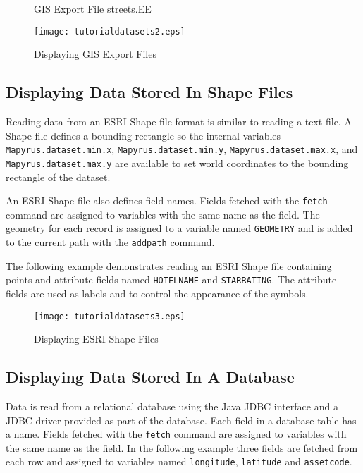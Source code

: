 \begin{figure}[htb]

\caption{GIS Export File streets.EE}
\label{streetsEE}
\end{figure}



\begin{figure}[htb]
\texttt{[image: tutorialdatasets2.eps]}
\caption{Displaying GIS Export Files}
\label{tutorialdatasets2}
\end{figure}

\subsection{Displaying Data Stored In Shape Files}

Reading data from an ESRI Shape file format is similar to reading a text file.
A Shape file defines a bounding rectangle so the internal variables
\texttt{Mapyrus.dataset.min.x}, \texttt{Mapyrus.dataset.min.y},
\texttt{Mapyrus.dataset.max.x}, and \texttt{Mapyrus.dataset.max.y} are
available to set world coordinates to the bounding rectangle of the dataset.

An ESRI Shape file also defines field names.  Fields fetched with the
\texttt{fetch} command are assigned to variables with the same name as the
field.  The geometry for each record is assigned to a variable named
\texttt{GEOMETRY} and is added to the current path with the \texttt{addpath}
command.

The following example demonstrates reading an ESRI Shape file containing points
and attribute fields named \texttt{HOTELNAME} and \texttt{STARRATING}.  The
attribute fields are used as labels and to control the appearance of the
symbols.



\begin{figure}[htb]
\texttt{[image: tutorialdatasets3.eps]}
\caption{Displaying ESRI Shape Files}
\label{tutorialdatasets3}
\end{figure}

\subsection{Displaying Data Stored In A Database}

Data is read from a relational database using
the Java JDBC interface and a JDBC driver provided
as part of the database.
Each field in a database table has a name.
Fields fetched with the
\texttt{fetch}
command are assigned to variables with the same name as the field.
In the following example three fields are fetched from each
row and assigned to variables named
\texttt{longitude}, \texttt{latitude} and \texttt{assetcode}.

